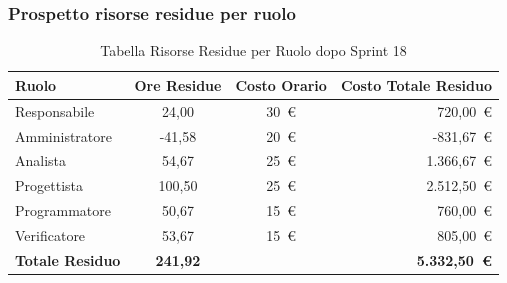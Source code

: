 \subsubsection{Prospetto risorse residue per ruolo}
\begin{table}[H]
    \centering
    \renewcommand{\arraystretch}{1.3}
    \begin{tabularx}{\textwidth}{|X|c|c|r|}
        \hline
        \textbf{Ruolo} & \textbf{Ore Residue} & \textbf{Costo Orario} &
        \textbf{Costo Totale Residuo} \\
        \hline
        Responsabile   & 24,00 & 30~\euro & 720{,}00~\euro \\
        Amministratore & -41,58 & 20~\euro & -831{,}67~\euro \\
        Analista       & 54,67 & 25~\euro & 1.366{,}67~\euro \\
        Progettista    & 100,50 & 25~\euro & 2.512{,}50~\euro \\
        Programmatore  & 50,67 & 15~\euro & 760{,}00~\euro \\
        Verificatore   & 53,67 & 15~\euro & 805{,}00~\euro \\
        \hline
        \textbf{Totale Residuo} & \textbf{241,92} & &
        \textbf{5.332{,}50~\euro} \\
        \hline
    \end{tabularx}
    \caption{Tabella Risorse Residue per Ruolo dopo Sprint 18}
\end{table}


